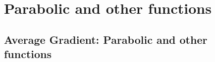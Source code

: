          \section{ Parabolic and other functions}
    \nopagebreak
\label{m39223*cid4}
            \subsection{ Average Gradient: Parabolic and other functions}
            \nopagebreak
\label{m39223*secfhsst!!!underscore!!!id252}
